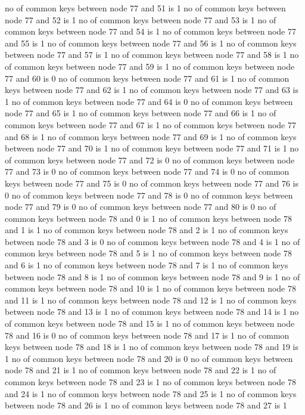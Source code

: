 no of common keys between node 77 and 51 is 1
no of common keys between node 77 and 52 is 1
no of common keys between node 77 and 53 is 1
no of common keys between node 77 and 54 is 1
no of common keys between node 77 and 55 is 1
no of common keys between node 77 and 56 is 1
no of common keys between node 77 and 57 is 1
no of common keys between node 77 and 58 is 1
no of common keys between node 77 and 59 is 1
no of common keys between node 77 and 60 is 0
no of common keys between node 77 and 61 is 1
no of common keys between node 77 and 62 is 1
no of common keys between node 77 and 63 is 1
no of common keys between node 77 and 64 is 0
no of common keys between node 77 and 65 is 1
no of common keys between node 77 and 66 is 1
no of common keys between node 77 and 67 is 1
no of common keys between node 77 and 68 is 1
no of common keys between node 77 and 69 is 1
no of common keys between node 77 and 70 is 1
no of common keys between node 77 and 71 is 1
no of common keys between node 77 and 72 is 0
no of common keys between node 77 and 73 is 0
no of common keys between node 77 and 74 is 0
no of common keys between node 77 and 75 is 0
no of common keys between node 77 and 76 is 0
no of common keys between node 77 and 78 is 0
no of common keys between node 77 and 79 is 0
no of common keys between node 77 and 80 is 0
no of common keys between node 78 and 0 is 1
no of common keys between node 78 and 1 is 1
no of common keys between node 78 and 2 is 1
no of common keys between node 78 and 3 is 0
no of common keys between node 78 and 4 is 1
no of common keys between node 78 and 5 is 1
no of common keys between node 78 and 6 is 1
no of common keys between node 78 and 7 is 1
no of common keys between node 78 and 8 is 1
no of common keys between node 78 and 9 is 1
no of common keys between node 78 and 10 is 1
no of common keys between node 78 and 11 is 1
no of common keys between node 78 and 12 is 1
no of common keys between node 78 and 13 is 1
no of common keys between node 78 and 14 is 1
no of common keys between node 78 and 15 is 1
no of common keys between node 78 and 16 is 0
no of common keys between node 78 and 17 is 1
no of common keys between node 78 and 18 is 1
no of common keys between node 78 and 19 is 1
no of common keys between node 78 and 20 is 0
no of common keys between node 78 and 21 is 1
no of common keys between node 78 and 22 is 1
no of common keys between node 78 and 23 is 1
no of common keys between node 78 and 24 is 1
no of common keys between node 78 and 25 is 1
no of common keys between node 78 and 26 is 1
no of common keys between node 78 and 27 is 1
